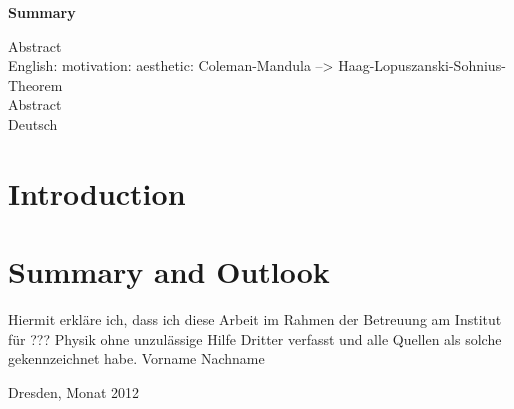 \begin{center}\large\bfseries Summary\end{center}
Abstract \\ 
English: motivation: aesthetic: Coleman-Mandula --> Haag-Lopuszanski-Sohnius-Theorem\\
\vspace{20em}
Abstract \\ 
Deutsch \\
\newpage
 
\tableofcontents
\newpage




\section{Introduction}

\newpage

\newpage

\newpage

\newpage

\newpage

\newpage

\newpage

\newpage
\section{Summary and Outlook}
\newpage

\newpage

\newpage
\clearpage
\thispagestyle{empty}
\vspace*{1.5em}
Hiermit erkläre ich, dass ich diese Arbeit im Rahmen der Betreuung am Institut
für ??? Physik ohne unzulässige Hilfe Dritter verfasst und alle Quellen als solche gekennzeichnet habe.
\vspace*{45em}
Vorname Nachname \par
Dresden, Monat 2012


